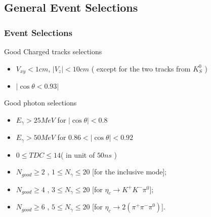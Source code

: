 \documentclass{beamer}
\begin{document}
\subsection{General Event Selections}
\begin{frame}
  \frametitle{Event Selections}
  \begin{block}{Good Charged tracks selections}
    \begin{itemize}
      \item $V_{xy} < 1 cm$, $ | V_z | < 10 cm$ ( except for the two tracks from $K_S^0$ )
      \item $|\cos\theta < 0.93 |$
    \end{itemize}
  \end{block}
  \begin{block}{Good photon selections}
    \begin{itemize}
      \item $E_{\gamma} > 25 MeV$ for $|\cos\theta| < 0.8$
      \item $E_{\gamma} > 50 MeV$ for $0.86<|\cos\theta|<0.92$
      \item $0\leq TDC\leq 14 $( in unit of $50ns$ )
    \end{itemize}
  \end{block}
  \begin{block}{}
    \begin{itemize}
      \item $N_{good}\ge 2$ ,  $1\leq N_{\gamma}\leq 20$ [for the inclusive mode];
      \item $N_{good}\ge 4$ ,  $3\leq N_{\gamma}\leq 20$ [for $\eta_c\to K^+K^-\pi^0$];
      \item $N_{good}\ge 6$ ,  $5\le N_{\gamma}\le 20 $  [for $\eta_c\to 2(\pi^+\pi^-\pi^0)$].
    \end{itemize}
  \end{block}
  \bigskip
\end{frame}
\end{document}
